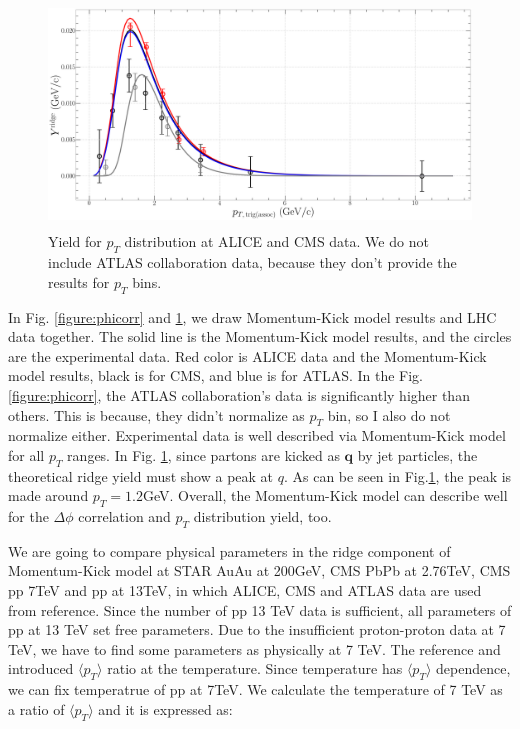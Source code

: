 \documentclass[jkps,fleqn,showpacs,showkeys]{revtex4}
\begin{document}
\begin{figure}[ht]
\centering
\includegraphics[width=12cm, height=6cm]{./Figures/Paper_pTdis}
\caption{Yield for $p_T$ distribution at ALICE and CMS data. We do not include ATLAS collaboration data, because they don't provide the results for $p_T$ bins.}
\label{figure:pTdis}
\end{figure}

In Fig. \ref{figure:phicorr} and \ref{figure:pTdis}, we draw Momentum-Kick model results and LHC data together.
The solid line is the Momentum-Kick model results, and the circles are the experimental data.
Red color is ALICE data and the Momentum-Kick model results, black is for CMS, and blue is for ATLAS.
In the Fig. \ref{figure:phicorr}, the ATLAS collaboration's data is significantly higher than others.
This is because, they didn't normalize as $p_T$ bin, so I also do not normalize either.
Experimental data is well described via Momentum-Kick model for all $p_T$ ranges.
In Fig. \ref{figure:pTdis}, since partons are kicked as $\textbf{q}$ by jet particles, the theoretical ridge yield must show a peak at $q$.
As can be seen in Fig.\ref{figure:pTdis}, the peak is made around $p_T=1.2$GeV.
Overall, the Momentum-Kick model can describe well for the $\Delta\phi$ correlation and $p_T$ distribution yield, too.


We are going to compare physical parameters in the ridge component of Momentum-Kick model at STAR AuAu at 200GeV\cite{Wong_1}, CMS PbPb at 2.76TeV\cite{PbPb}, CMS pp 7TeV\cite{cms} and pp at 13TeV, in which ALICE, CMS and ATLAS data are used from reference\cite{alice, cms, atlas}.
Since the number of pp 13 TeV data is sufficient, all parameters of pp at 13 TeV set free parameters.
Due to the insufficient proton-proton data at 7 TeV, we have to find some parameters as physically at 7 TeV.
The reference \cite{Wong_5} and \cite{PbPb} introduced $\langle p_T \rangle$ ratio at the temperature.
Since temperature has $\langle p_T \rangle$ dependence, we can fix temperatrue of pp at 7TeV.
We calculate the temperature of 7 TeV as a ratio of $\langle p_T \rangle$ and it is expressed as:
\end{document}
